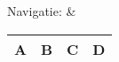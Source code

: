 Navigatie: &
\begin{tabular}{|c|c|c|c|}
	\hline 
	\textbf{A} & \textbf{B} & \textbf{C} & \textbf{D} \\
	\hline 
\end{tabular} \\